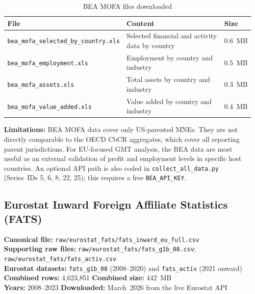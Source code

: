 \documentclass[11pt,a4paper]{article}
\begin{document}
\begin{table}[H]
\centering
\caption{BEA MOFA files downloaded}\label{tab:bea_files}
\begin{tabular}{@{}L{5.5cm} L{6.5cm} C{1.5cm}@{}}
\toprule
\textbf{File} & \textbf{Content} & \textbf{Size} \\
\midrule
\texttt{bea\_mofa\_selected\_by\_country.xls}  & Selected financial and activity data by country & 0.6~MB \\
\texttt{bea\_mofa\_employment.xls}             & Employment by country and industry & 0.5~MB \\
\texttt{bea\_mofa\_assets.xls}                 & Total assets by country and industry & 0.3~MB \\
\texttt{bea\_mofa\_value\_added.xls}           & Value added by country and industry & 0.4~MB \\
\bottomrule
\end{tabular}
\end{table}

\noindent\textbf{Limitations:} BEA MOFA data cover only US-parented MNEs.  They are not directly comparable to the OECD CbCR aggregates, which cover all reporting parent jurisdictions.  For EU-focused GMT analysis, the BEA data are most useful as an external validation of profit and employment levels in specific host countries.  An optional API path is also coded in \texttt{collect\_all\_data.py} (Series~IDs 5, 6, 8, 22, 25); this requires a free \texttt{BEA\_API\_KEY}.


\subsection{Eurostat Inward Foreign Affiliate Statistics (FATS)}\label{sec:fats}

\textbf{Canonical file:} \texttt{raw/eurostat\_fats/fats\_inward\_eu\_full.csv}\\
\textbf{Supporting raw files:} \texttt{raw/eurostat\_fats/fats\_g1b\_08.csv};\quad
\texttt{raw/eurostat\_fats/fats\_activ.csv}\\
\textbf{Eurostat datasets:} \texttt{fats\_g1b\_08} (2008--2020) and \texttt{fats\_activ} (2021 onward)\\
\textbf{Combined rows:} 4{,}623{,}851 \quad \textbf{Combined size:} 442~MB\\
\textbf{Years:} 2008--2023 \quad \textbf{Downloaded:} March~2026 from the live Eurostat API
\end{document}
